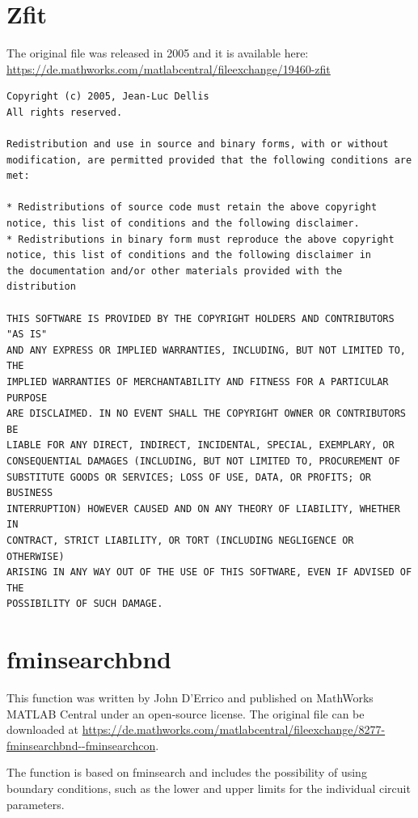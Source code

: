 \documentclass[10pt,a4paper,oneside]{book}
\begin{document}
\section{Zfit}

The original file was released in 2005 and it is available here:\\

\url{https://de.mathworks.com/matlabcentral/fileexchange/19460-zfit}

\begin{small}
\begin{verbatim}
Copyright (c) 2005, Jean-Luc Dellis
All rights reserved.

Redistribution and use in source and binary forms, with or without
modification, are permitted provided that the following conditions are
met:

* Redistributions of source code must retain the above copyright
notice, this list of conditions and the following disclaimer.
* Redistributions in binary form must reproduce the above copyright
notice, this list of conditions and the following disclaimer in
the documentation and/or other materials provided with the distribution

THIS SOFTWARE IS PROVIDED BY THE COPYRIGHT HOLDERS AND CONTRIBUTORS "AS IS"
AND ANY EXPRESS OR IMPLIED WARRANTIES, INCLUDING, BUT NOT LIMITED TO, THE
IMPLIED WARRANTIES OF MERCHANTABILITY AND FITNESS FOR A PARTICULAR PURPOSE
ARE DISCLAIMED. IN NO EVENT SHALL THE COPYRIGHT OWNER OR CONTRIBUTORS BE
LIABLE FOR ANY DIRECT, INDIRECT, INCIDENTAL, SPECIAL, EXEMPLARY, OR
CONSEQUENTIAL DAMAGES (INCLUDING, BUT NOT LIMITED TO, PROCUREMENT OF
SUBSTITUTE GOODS OR SERVICES; LOSS OF USE, DATA, OR PROFITS; OR BUSINESS
INTERRUPTION) HOWEVER CAUSED AND ON ANY THEORY OF LIABILITY, WHETHER IN
CONTRACT, STRICT LIABILITY, OR TORT (INCLUDING NEGLIGENCE OR OTHERWISE)
ARISING IN ANY WAY OUT OF THE USE OF THIS SOFTWARE, EVEN IF ADVISED OF THE
POSSIBILITY OF SUCH DAMAGE.
\end{verbatim}
\end{small}


\section{fminsearchbnd}

This function was written by John D'Errico and published on MathWorks MATLAB Central under an open-source license. The original file can be downloaded at \url{https://de.mathworks.com/matlabcentral/fileexchange/8277-fminsearchbnd--fminsearchcon}.

The function is based on fminsearch and includes the possibility of using boundary conditions, such as the lower and upper limits for the individual circuit parameters.
\end{document}
